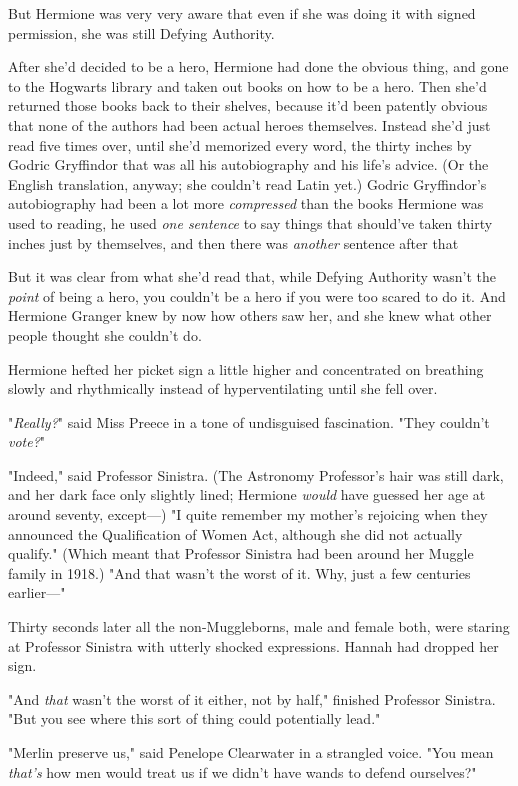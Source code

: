 But Hermione was very very aware that even if she was doing it with signed
permission, she was still Defying Authority.

After she'd decided to be a hero, Hermione had done the obvious thing, and gone
to the Hogwarts library and taken out books on how to be a hero. Then she'd
returned those books back to their shelves, because it'd been patently obvious
that none of the authors had been actual heroes themselves. Instead she'd just
read five times over, until she'd memorized every word, the thirty inches by
Godric Gryffindor that was all his autobiography and his life's advice. (Or the
English translation, anyway; she couldn't read Latin yet.) Godric Gryffindor's
autobiography had been a lot more \emph{compressed} than the books Hermione was
used to reading, he used \emph{one sentence} to say things that should've taken
thirty inches just by themselves, and then there was \emph{another} sentence
after that{\el}

But it was clear from what she'd read that, while Defying Authority wasn't the
\emph{point} of being a hero, you couldn't be a hero if you were too scared to
do it. And Hermione Granger knew by now how others saw her, and she knew what
other people thought she couldn't do.

Hermione hefted her picket sign a little higher and concentrated on breathing
slowly and rhythmically instead of hyperventilating until she fell over.

"\emph{Really?}" said Miss Preece in a tone of undisguised fascination. "They
couldn't \emph{vote?}"

"Indeed," said Professor Sinistra. (The Astronomy Professor's hair was still
dark, and her dark face only slightly lined; Hermione \emph{would} have guessed
her age at around seventy, except---) "I quite remember my mother's rejoicing
when they announced the Qualification of Women Act, although she did not
actually qualify." (Which meant that Professor Sinistra had been around her
Muggle family in 1918.) "And that wasn't the worst of it. Why, just a few
centuries earlier\mbox{---}"

Thirty seconds later all the non-Muggleborns, male and female both, were
staring at Professor Sinistra with utterly shocked expressions. Hannah had
dropped her sign.

"And \emph{that} wasn't the worst of it either, not by half," finished
Professor Sinistra. "But you see where this sort of thing could potentially
lead."

"Merlin preserve us," said Penelope Clearwater in a strangled voice. "You mean
\emph{that's} how men would treat us if we didn't have wands to defend
ourselves?"

